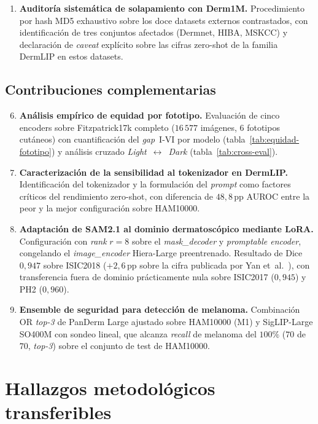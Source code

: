 \begin{enumerate}
\item \textbf{Auditoría sistemática de solapamiento con Derm1M.}
Procedimiento por hash MD5 exhaustivo sobre los doce datasets
externos contrastados, con identificación de tres conjuntos
afectados (Dermnet, HIBA, MSKCC) y declaración de \emph{caveat}
explícito sobre las cifras zero-shot de la familia DermLIP en
estos datasets.
\end{enumerate}

\subsection{Contribuciones complementarias}
\label{sec:contrib-anexos}

\begin{enumerate}
\setcounter{enumi}{5}
\item \textbf{Análisis empírico de equidad por fototipo.}
Evaluación de cinco encoders sobre Fitzpatrick17k completo
($16\,577$ imágenes, $6$ fototipos cutáneos) con
cuantificación del \emph{gap}~I-VI por modelo
(tabla~\ref{tab:equidad-fototipo}) y análisis cruzado
\emph{Light}~$\leftrightarrow$~\emph{Dark}
(tabla~\ref{tab:cross-eval}).

\item \textbf{Caracterización de la sensibilidad al tokenizador en
DermLIP.} Identificación del tokenizador y la formulación del
\emph{prompt} como factores críticos del rendimiento zero-shot,
con diferencia de $48{,}8$\,pp AUROC entre la peor y la mejor
configuración sobre HAM10000.

\item \textbf{Adaptación de SAM2.1 al dominio dermatoscópico
mediante LoRA.} Configuración con \emph{rank} $r = 8$ sobre el
\emph{mask\_decoder} y \emph{promptable encoder}, congelando el
\emph{image\_encoder} Hiera-Large preentrenado. Resultado de Dice
$0{,}947$ sobre ISIC2018 ($+2{,}6$\,pp sobre la cifra
publicada por Yan et~al.~\cite{panderm2025}), con transferencia
fuera de dominio prácticamente nula sobre ISIC2017 ($0{,}945$)
y PH2 ($0{,}960$).

\item \textbf{Ensemble de seguridad para detección de melanoma.}
Combinación OR \emph{top-3} de PanDerm Large ajustado sobre
HAM10000 (M1) y SigLIP-Large SO400M con sondeo lineal, que alcanza
\emph{recall} de melanoma del $100\%$
($70$ de $70$, \emph{top-3}) sobre el conjunto de test de
HAM10000.
\end{enumerate}

\section{Hallazgos metodológicos transferibles}
\label{sec:hallazgos-conc}

